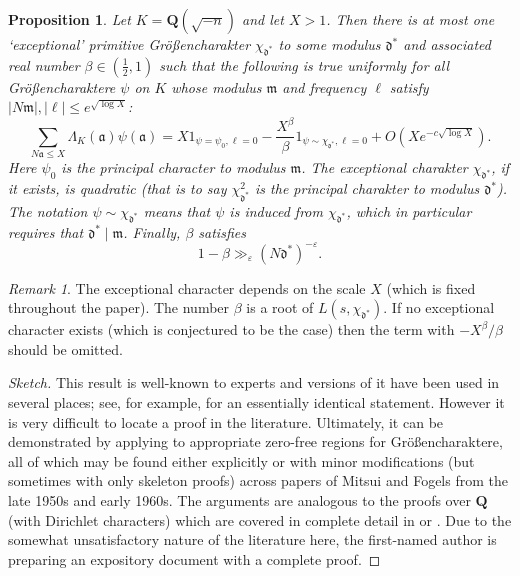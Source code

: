 \documentclass[11pt,reqno]{amsart}
\numberwithin{equation}{section}
\newtheorem{proposition}[theorem]{Proposition}
\theoremstyle{definition}
\theoremstyle{remark}
\newtheorem*{remark}{Remark}
\newcommand{\mf}{\mathfrak}
\newcommand{\eps}{\varepsilon}
\renewcommand{\le}{\leqslant}
\newcommand\Q{\mathbf{Q}}
\begin{document}
\begin{proposition}\label{main-analytic-input}
Let $K = \Q(\sqrt{-n})$ and let $X > 1$. Then there is at most one `exceptional' primitive Gr\"o{\ss}encharakter $\chi_{\mf{d}^*}$ to some modulus $\mf{d}^*$ and associated real number $\beta \in (\frac{1}{2}, 1)$ such that the following is true uniformly for all Gr\"o{\ss}encharaktere $\psi$ on $K$ whose modulus $\mf{m}$ and frequency $\ell$ satisfy $|N\mf{m}|, |\ell| \le e^{\sqrt{\log X}}$:
\[ \sum_{N\mf{a} \le X} \Lambda_K(\mf{a}) \psi(\mf{a}) = X 1_{\psi = \psi_0, \ell = 0} - \frac{X^{\beta}}{\beta} 1_{\psi \sim \chi_{\mf{d}^*}, \ell = 0} + O(Xe^{-c\sqrt{\log X}}).\]
Here $\psi_0$ is the principal character to modulus $\mf{m}$. The exceptional charakter $\chi_{\mf{d}^*}$, if it exists, is quadratic \textup{(}that is to say $\chi_{\mf{d}^*}^2$ is the principal charakter to modulus $\mf{d}^*$\textup{)}. The notation $\psi \sim \chi_{\mf{d}^*}$ means that $\psi$ is induced from $\chi_{\mf{d}^*}$, which in particular requires that $\mf{d}^* \mid \mf{m}$. Finally, $\beta$ satisfies
\begin{equation}\label{siegel-thm} 1 - \beta \gg_{\eps} (N\mf{d}^*)^{-\eps}
.\end{equation}
\end{proposition}
\begin{remark}
The exceptional character depends on the scale $X$ (which is fixed throughout the paper). The number $\beta$ is a root of $L(s, \chi_{\mf{d}^*})$. If no exceptional character exists (which is conjectured to be the case) then the term with $-X^{\beta}/\beta$ should be omitted.
\end{remark}
\begin{proof}[Sketch]
This result is well-known to experts and versions of it have been used in several places; see, for example, \cite[Lemma 4.5]{maynard-norm-forms} for an essentially identical statement. However it is very difficult to locate a proof in the literature. Ultimately, it can be demonstrated by applying \cite[Theorem 5.13]{IK-book} to appropriate zero-free regions for Gr\"o{\ss}encharaktere, all of which may be found either explicitly or with minor modifications (but sometimes with only skeleton proofs) across papers of Mitsui \cite{Mitsui} and Fogels \cite{fogels-1,fogels-2,fogels-3} from the late 1950s and early 1960s. The arguments are analogous to the proofs over $\Q$ (with Dirichlet characters) which are covered in complete detail in \cite{davenport-book} or \cite{MV-book}. Due to the somewhat unsatisfactory nature of the literature here, the first-named author is preparing an expository document \cite{BJG-hecke-exposition} with a complete proof. 
\end{proof}
\end{document}
